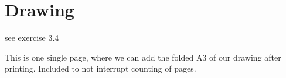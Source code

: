 \chapter{Drawing}

see exercise 3.4


\clearpage
\Huge{This is one single page, where we can add the folded A3 of our drawing after printing.
Included to not interrupt counting of pages.}
\newpage